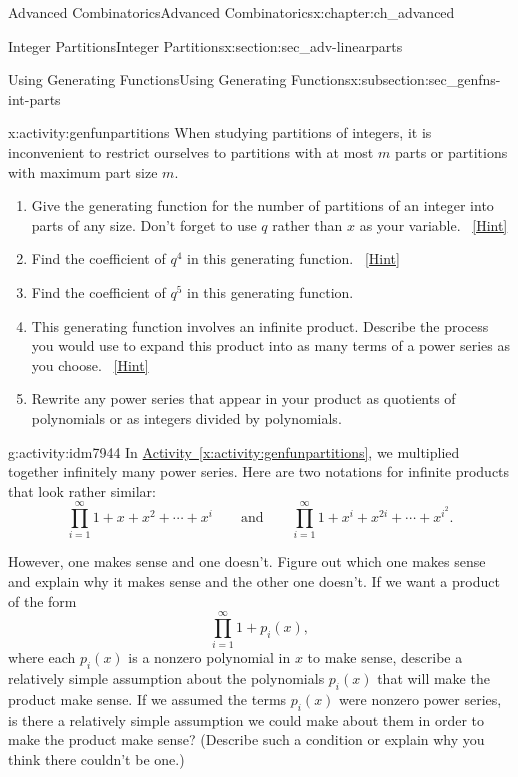\documentclass[oneside,10pt,]{book}
\numberwithin{equation}{chapter}
\begin{document}
\begin{chapterptx}{Advanced Combinatorics}{}{Advanced Combinatorics}{}{}{x:chapter:ch_advanced}
\begin{sectionptx}{Integer Partitions}{}{Integer Partitions}{}{}{x:section:sec_adv-linearparts}
\begin{subsectionptx}{Using Generating Functions}{}{Using Generating Functions}{}{}{x:subsection:sec_genfns-int-parts}
\begin{activity}{}{x:activity:genfunpartitions}
When studying partitions of integers, it is inconvenient to restrict ourselves to partitions with at most \(m\) parts or partitions with maximum part size \(m\).%
\begin{enumerate}[font=\bfseries,label=(\alph*),ref=\alph*]
\item{}Give the generating function for the number of partitions of an integer into parts of any size. Don't forget to use \(q\) rather than \(x\) as your variable.%
\qquad~\hfill{\tiny\hyperlink{g:hint:idm7881-back}{[Hint]}}\item{}Find the coefficient of \(q^4\) in this generating function.%
\qquad~\hfill{\tiny\hyperlink{g:hint:idm7891-back}{[Hint]}}\item{}Find the coefficient of \(q^5\) in this generating function.%
\item{}This generating function involves an infinite product. Describe the process you would use to expand this product into as many terms of a power series as you choose.%
\qquad~\hfill{\tiny\hyperlink{g:hint:idm7929-back}{[Hint]}}\item{}Rewrite any power series that appear in your product as quotients of polynomials or as integers divided by polynomials.%
\end{enumerate}
\end{activity}
\begin{activity}{}{g:activity:idm7944}%
In \hyperref[x:activity:genfunpartitions]{Activity~\ref{x:activity:genfunpartitions}}, we multiplied together infinitely many power series. Here are two notations for infinite products that look rather similar:%
\begin{equation*}
\prod_{i=1}^\infty 1 + x + x^2 +\cdots+ x^i\qquad\mbox{and}\qquad
\prod_{i=1}^\infty 1 +x^i +x^{2i} +\cdots + x^{i^2}.
\end{equation*}
%
\par
However, one makes sense and one doesn't. Figure out which one makes sense and explain why it makes sense and the other one doesn't. If we want a product of the form%
\begin{equation*}
\prod_{i=1}^\infty 1 +p_i(x),
\end{equation*}
where each \(p_i(x)\) is a nonzero polynomial in \(x\) to make sense, describe a relatively simple assumption about the polynomials \(p_i(x)\) that will make the product make sense. If we assumed the terms \(p_i(x)\) were nonzero power series, is there a relatively simple assumption we could make about them in order to make the product make sense? (Describe such a condition or explain why you think there couldn't be one.)%

\end{activity}
\end{subsectionptx}
\end{sectionptx}
\end{chapterptx}
\end{document}
